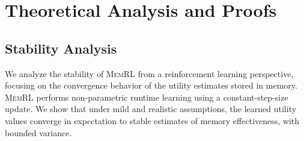 \documentclass{article}
\theoremstyle{plain}
\theoremstyle{definition}
\theoremstyle{remark}
\begin{document}





\newpage
\onecolumn
\appendix
\raggedbottom


\section{Theoretical Analysis and Proofs}
\label{app:theoretical_analysis}
\subsection{Stability Analysis}
\label{app:stability}

We analyze the stability of \textsc{MemRL} from a reinforcement learning perspective, focusing on the convergence behavior of the utility estimates stored in memory. \textsc{MemRL} performs non-parametric runtime learning using a constant-step-size update. We show that under mild and realistic assumptions, the learned utility values converge in expectation to stable estimates of memory effectiveness, with bounded variance.
\end{document}

